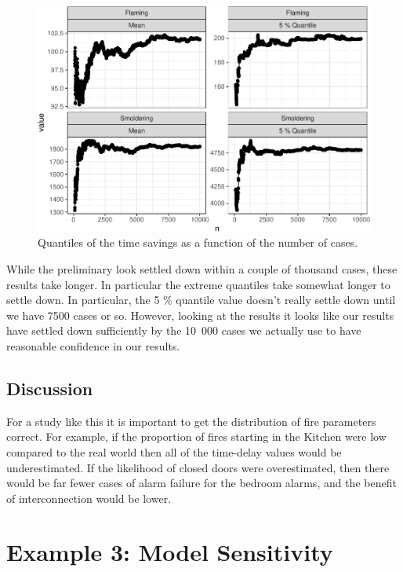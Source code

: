 \documentclass[12pt,twoside]{book}
\begin{document}
\begin{figure}[h!]
\centering
\includegraphics[width=4.5in]{FIGURES/cvg_plot-1.pdf}
\caption{Quantiles of the time savings as a function of the number of cases.}
\label{Ex_3-quintiles}
\end{figure}

While the preliminary look settled down within a couple of thousand cases, these results take longer. In particular the extreme quantiles take somewhat longer to settle down. In particular, the 5 \% quantile value doesn't really settle down until we have 7500 cases or so. However, looking at the results it looks like our results have settled down sufficiently by the 10~000 cases we actually use to have reasonable confidence in our results.

\hypertarget{discussion}{%
\subsection{Discussion}\label{discussion}}

For a study like this it is important to get the distribution of fire parameters correct. For example, if the proportion of fires starting in the Kitchen were low compared to the real world then all of the time-delay values would be underestimated. If the likelihood of closed doors were overestimated, then there would be far fewer cases of alarm failure for the bedroom alarms, and the benefit of interconnection would be lower.

%
%

\section{Example 3: Model Sensitivity}
\end{document}

